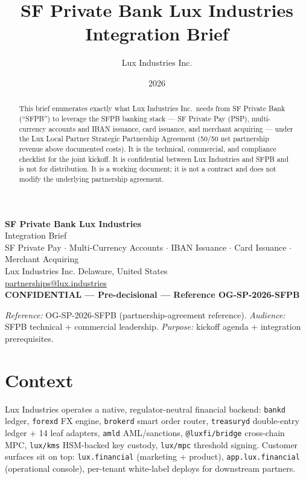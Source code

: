 \documentclass[11pt,letterpaper]{article}
\title{SF Private Bank \texttimes{} Lux Industries \\ \vspace{0.4em}
       Integration Brief}
\author{Lux Industries Inc.}
\date{2026}
\begin{document}
\luxcoverpage

\begin{center}
{\Huge\bfseries\color{luxblue} SF Private Bank \texttimes{} Lux Industries}\\[0.4em]
{\Large\color{luxaccent} Integration Brief}\\[0.6em]
{\large SF Private Pay $\cdot$ Multi-Currency Accounts $\cdot$ IBAN Issuance $\cdot$ Card Issuance $\cdot$ Merchant Acquiring}\\[1em]
{\small Lux Industries Inc. \textbar{} Delaware, United States\\
\href{mailto:partnerships@lux.industries}{partnerships@lux.industries}}\\[0.6em]
{\small\textbf{\textcolor{confidred}{CONFIDENTIAL --- Pre-decisional --- Reference OG-SP-2026-SFPB}}}
\end{center}

\vspace{0.6em}

\begin{abstract}
\noindent This brief enumerates exactly what Lux Industries Inc.\ needs
from SF Private Bank (``SFPB'') to leverage the SFPB banking stack ---
SF Private Pay (PSP), multi-currency accounts and IBAN issuance, card
issuance, and merchant acquiring --- under the Lux \texttimes{} Local
Partner Strategic Partnership Agreement (50/50 net partnership revenue
above documented costs). It is the technical, commercial, and compliance
checklist for the joint kickoff. It is confidential between Lux
Industries and SFPB and is not for distribution. It is a working
document; it is not a contract and does not modify the underlying
partnership agreement.
\end{abstract}

\vspace{0.4em}
\noindent\textit{Reference:} OG-SP-2026-SFPB (partnership-agreement
reference). \textit{Audience:} SFPB technical + commercial leadership.
\textit{Purpose:} kickoff agenda + integration prerequisites.

\section{Context}

Lux Industries operates a native, regulator-neutral financial backend:
\texttt{bankd} ledger, \texttt{forexd} FX engine, \texttt{brokerd} smart
order router, \texttt{treasuryd} double-entry ledger + 14 leaf adapters,
\texttt{amld} AML/sanctions, \texttt{@luxfi/bridge} cross-chain MPC,
\texttt{lux/kms} HSM-backed key custody, \texttt{lux/mpc} threshold
signing. Customer surfaces sit on top: \texttt{lux.financial} (marketing
+ product), \texttt{app.lux.financial} (operational console), per-tenant
white-label deploys for downstream partners.
\end{document}
